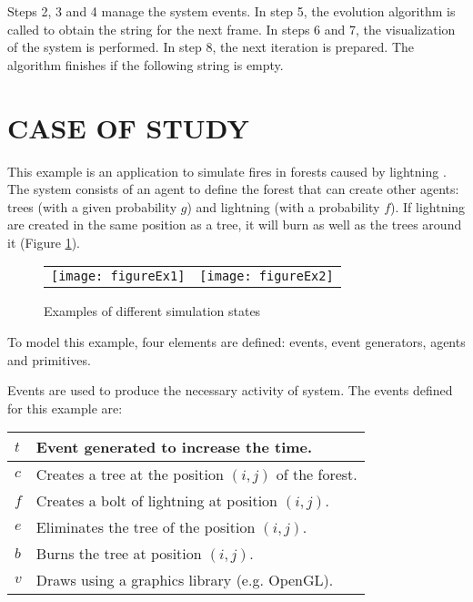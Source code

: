 \documentclass[a4paper,twoside]{article}
\begin{document}
Steps 2, 3 and 4 manage the system events. In step 5, the evolution algorithm is called to obtain
the string for the next frame. In steps 6 and 7, the visualization of the system is performed. In
step 8, the next iteration is prepared. The algorithm finishes if the following string is empty.

\section{\uppercase{Case of Study}
\label{sec:case_study}}

\noindent This example is an application to simulate fires in forests caused by lightning
\cite{John2007}. The system consists of an agent to define the forest that can create other agents:
trees (with a given probability $g$) and lightning (with a probability $f$). If lightning are
created in the same position as a tree, it will burn as well as the trees around it (Figure
\ref{fig:example1}).

\begin{figure}[htb]
    \centering
    \begin{tabular}{cc}
        \texttt{[image: figureEx1]} &
        \texttt{[image: figureEx2]}
    \end{tabular}
    \caption{\label{fig:example1} Examples of different simulation states}
\end{figure}


To model this example, four elements are defined:
events, event generators, agents and primitives.

Events are used to produce the necessary activity of system.
The events defined for this example are:


\begin{table}[h]
\begin{center}
\begin{small}
    \begin{tabular}{|l|l|}
        \hline $t$   & Event generated to increase the time.\\
        \hline $c$   & Creates a tree at the position $(i, j)$ of the forest.\\
        \hline $f$   & Creates a bolt of lightning at position $(i, j)$.\\
        \hline $e$   & Eliminates the tree of the position $(i, j)$.\\
        \hline $b$   & Burns the tree at position $(i, j)$.\\
        \hline $v$   & Draws using a graphics library (e.g. OpenGL).\\
        \hline
\end{tabular}
\end{small}
\end{center}
\vspace{-0.3cm}
\end{table}
\end{document}
